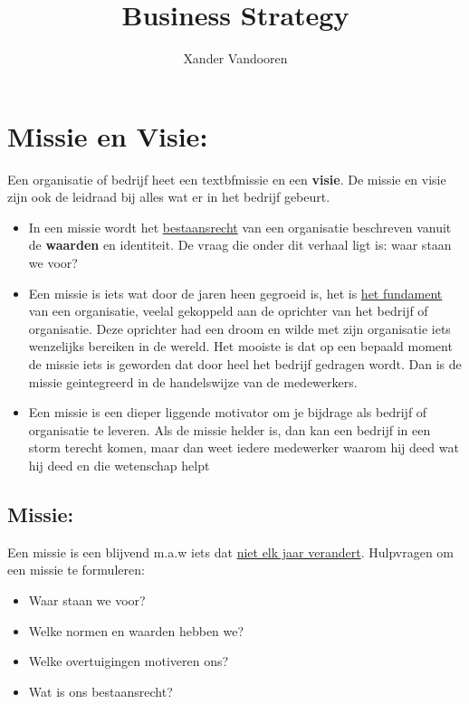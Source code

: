 \documentclass[12pt]{article}
\begin{document}
\begin{titlepage}
    \author{Xander Vandooren}
    \title{Business Strategy}
\end{titlepage}
\maketitle
\newpage
\tableofcontents
\newpage
{}
\section{Missie en Visie:}
Een organisatie of bedrijf heet een 
textbf{missie} en een \textbf{visie}. De missie en visie zijn ook de leidraad bij alles wat er in het bedrijf gebeurt.
\begin{itemize}
    \item In een missie wordt het \underline{bestaansrecht} van een organisatie beschreven vanuit de \textbf{waarden} en identiteit. De vraag die onder dit verhaal ligt is: waar staan we voor?
    \item Een missie is iets wat door de jaren heen gegroeid is, het is \underline{het fundament} van een organisatie, veelal gekoppeld aan de oprichter van het bedrijf of organisatie. Deze oprichter had een droom en wilde met zijn organisatie iets wenzelijks bereiken in de wereld. Het mooiste is dat op een bepaald moment de missie iets is geworden dat door heel het bedrijf gedragen wordt. Dan is de missie geintegreerd in de handelswijze van de medewerkers.
    \item Een missie is een dieper liggende motivator om je bijdrage als bedrijf of organisatie te leveren. Als de missie helder is, dan kan een bedrijf in een storm terecht komen, maar dan weet iedere medewerker waarom hij deed wat hij deed en die wetenschap helpt
\end{itemize}
\subsection{Missie:}
Een missie is een blijvend m.a.w iets dat \underline{niet elk jaar verandert}.\newline
Hulpvragen om een missie te formuleren:
\begin{itemize}
    \item Waar staan we voor?
    \item Welke normen en waarden hebben we?
    \item Welke overtuigingen motiveren ons?
    \item Wat is ons bestaansrecht?
\end{itemize}
\end{document}

